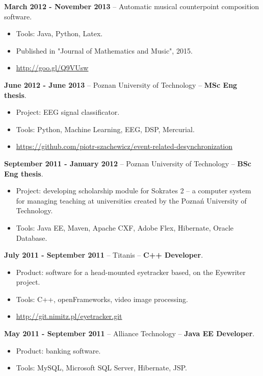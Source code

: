 \documentclass[10pt]{article}
\begin{document}
\textbf{March 2012 - November 2013} -- Automatic musical counterpoint composition software.  \begin{itemize} \item Tools: Java, Python, Latex.
  \item Published in "Journal of Mathematics and Music", 2015.
  \item \url{http://goo.gl/Q9VUsw}
\end{itemize}

\textbf{June 2012 - June 2013} -- Poznan University of Technology -- \textbf{MSc Eng thesis}.
\begin{itemize}
  \item Project: EEG signal classificator.
  \item Tools: Python, Machine Learning, EEG, DSP, Mercurial.
  \item \url{https://github.com/piotr-szachewicz/event-related-desynchronization}
\end{itemize}

\pagebreak

\textbf{September 2011 - January 2012} -- Poznan University of Technology -- \textbf{BSc Eng thesis}.

\begin{itemize}
  \item Project: developing scholarship module for Sokrates 2 -- a computer system for managing teaching at universities created by the Poznań University of Technology.
  \item Tools: Java EE, Maven, Apache CXF, Adobe Flex, Hibernate, Oracle Database.
\end{itemize}

\textbf{July 2011 - September 2011} -- Titanis -- \textbf{C++ Developer}.
\begin{itemize}
  \item Product: software for a head-mounted eyetracker based, on the Eyewriter project.
  \item Tools: C++, openFrameworks, video image processing.
  \item \url{http://git.nimitz.pl/eyetracker.git}
\end{itemize}

\textbf{May 2011 - September 2011} -- Alliance Technology -- \textbf{Java EE Developer}.
\begin{itemize}
  \item Product: banking software.
  \item Tools: MySQL, Microsoft SQL Server, Hibernate, JSP.
\end{itemize}
\end{document}
